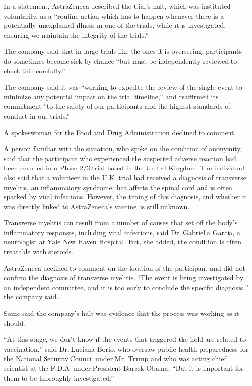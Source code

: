 In a statement, AstraZeneca described the trial's halt, which was
instituted voluntarily, as a ``routine action which has to happen
whenever there is a potentially unexplained illness in one of the
trials, while it is investigated, ensuring we maintain the integrity of
the trials.''

The company said that in large trials like the ones it is overseeing,
participants do sometimes become sick by chance ``but must be
independently reviewed to check this carefully.''

The company said it was ``working to expedite the review of the single
event to minimize any potential impact on the trial timeline,'' and
reaffirmed its commitment ``to the safety of our participants and the
highest standards of conduct in our trials.''

A spokeswoman for the Food and Drug Administration declined to comment.

A person familiar with the situation, who spoke on the condition of
anonymity, said that the participant who experienced the suspected
adverse reaction had been enrolled in a Phase 2/3 trial based in the
United Kingdom. The individual also said that a volunteer in the U.K.
trial had received a diagnosis of transverse myelitis, an inflammatory
syndrome that affects the spinal cord and is often sparked by viral
infections. However, the timing of this diagnosis, and whether it was
directly linked to AstraZeneca's vaccine, is still unknown.

Transverse myelitis can result from a number of causes that set off the
body's inflammatory responses, including viral infections, said Dr.
Gabriella Garcia, a neurologist at Yale New Haven Hospital. But, she
added, the condition is often treatable with steroids.

AstraZeneca declined to comment on the location of the participant and
did not confirm the diagnosis of transverse myelitis. ``The event is
being investigated by an independent committee, and it is too early to
conclude the specific diagnosis,'' the company said.

Some said the company's halt was evidence that the process was working
as it should.

``At this stage, we don't know if the events that triggered the hold are
related to vaccination,'' said Dr. Luciana Borio, who oversaw public
health preparedness for the National Security Council under Mr. Trump
and who was acting chief scientist at the F.D.A. under President Barack
Obama. ``But it is important for them to be thoroughly investigated.''

